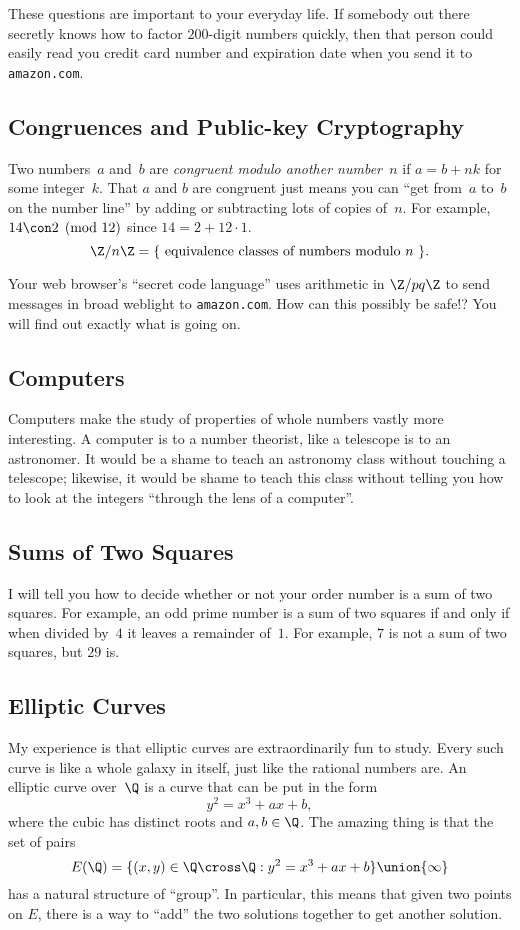 \documentclass[11pt]{report}
\begin{document}
These questions are important to your everyday life. If somebody out
there secretly knows how to factor $200$-digit numbers quickly, then
that person could easily read you credit card number and expiration date when
you send it to {\tt amazon.com}.

\subsection{Congruences and Public-key Cryptography}
Two numbers~$a$ and~$b$ are {\em congruent modulo another number~$n$} if
$a=b+nk$ for some integer~$k$.  That $a$ and $b$ are congruent
just means you can ``get from~$a$  to~$b$ on the number line''
by adding or subtracting lots of copies of~$n$.
For example, $14\con 2\pmod{12}$ since
$14=2+12\cdot 1$.
$$\Z/n\Z = \{\text{ equivalence classes of numbers modulo~$n$ }\}.$$

Your web browser's ``secret code language'' uses arithmetic in
$\Z/pq\Z$ to send messages in broad weblight to
  {\tt amazon.com}.  How can this possibly be safe!?
You will find out exactly what is going on.

\subsection{Computers}

Computers make the study of properties of whole numbers vastly more
interesting.  A computer is to a number theorist, like a telescope is
to an astronomer.   It would be a shame to teach an astronomy class
without touching a telescope; likewise, it would be shame to teach
this class without telling you how to look at the integers ``through
the lens of a computer''.


\subsection{Sums of Two Squares}
I will tell you how to decide whether or not your order number is a
sum of two squares.  For example, an odd prime number is a sum of two
squares if and only if when divided by~$4$ it leaves a remainder
of~$1$.  For example, $7$ is not a sum of two squares, but $29$ is.

\subsection{Elliptic Curves}
My experience is that elliptic curves are extraordinarily fun to
study.  Every such curve is like a whole galaxy in itself, just like
the rational numbers are.
An
elliptic curve over~$\Q$ is a curve that can be put in the form
$$y^2 = x^3 + ax+b,$$
where the cubic has distinct roots and $a, b\in \Q$.
The amazing thing is that the set of pairs
$$E(\Q) = \{ (x,y)\in \Q\cross \Q : y^2 = x^3 + ax +b \} \union \{\infty\}$$
has a natural structure of ``group''.  In particular,
this means that given two points on $E$, there is a way
to ``add'' the two solutions together to get
another solution.
\end{document}
